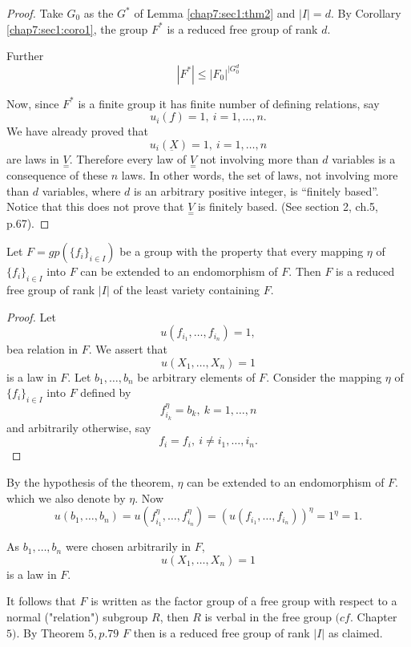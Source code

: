 \begin{proof}
  Take $G_0$ as the $G^*$ of Lemma \ref{chap7:sec1:thm2} and $|I| = d
  $. By Corollary\pageoriginale 
  \ref{chap7:sec1:coro1}, the group $F^*$ is a reduced free group of
  rank $d$.   

  Further
  $$
  |F^*| \leq  |F_0|^{|G_0^{d}}
  $$
  
  Now, since $F^*$  is a finite group it has finite number of defining
  relations, say 
  $$
  u_i(\underbar{f}) = 1, ~ i=1, \ldots,n.
  $$
  We have already proved that 
  $$
  u_i(\underbar{X}) = 1, ~ i=1, \ldots,n
  $$
  are laws in $\underset{=}{V}$. Therefore every law of
  $\underset{=}{V}$ not involving more than $d$ variables is a
  consequence of these $n$ laws. In other words, the set of laws, not
  involving more than $d$ variables, where $d$ is an arbitrary
  positive integer, is ``finitely based''. Notice that  this does not
  prove that $\underset{=}{V}$ is finitely based. (See section 2,
  ch.5, p.67).  
\end{proof}

\begin{theorem}\label{chap7:sec1:thm3} 
  Let $F = gp ( \big\{ f_i \big \}_{i
    \in I})$ be a group with the property that every mapping
  $\eta$ of $ \big \{ f_i \big \}_{i \in I} $ into $F$ can be
  extended to an endomorphism of $F$. Then $F$ is a reduced free group
  of rank $|I|$ of the least variety containing $F$.  
\end{theorem}

\begin{proof}
  Let
  $$
  u(f_{i_{1}}, \ldots, f_{i_{n}}) = 1,
  $$
  be\pageoriginale a relation in $F$. We assert that 
  $$
  u(X_1, \ldots,X_n) = 1
  $$
  is a law in $F$. Let $b_1, \ldots,b_n$ be arbitrary elements of
  $F$. Consider the mapping $\eta$ of $\big\{ f_i \big\}_{i
    \in I}$ into $F$ defined by 
  $$
  f^\eta_{i_{k}} = b_k, ~ k = 1,\ldots,n
  $$
  and arbitrarily otherwise, say
  $$
  f_i = f_i, ~ i \neq i_1, \ldots,i_n. 
  $$
\end{proof}

By the hypothesis  of the theorem, $\eta$ can be extended to an
endomorphism of $F$. which we also denote by  $\eta$. Now 
$$
u(b_1,\ldots,b_n) = u(f^\eta_{i_{1}},\ldots,f^\eta_{i_{n}}) = (u
(f_{i_{1}},\ldots,f_{i_{n}} ))^\eta = 1^\eta = 1. 
$$

As $b_1,\ldots,b_n$ were chosen arbitrarily in $F$,
$$
u(X_1,\ldots,X_n) = 1
$$
is a law in $F$.

It follows that $F$ is written as the factor group of a free group
with respect to a normal ("relation") subgroup $R$, then $R$ is verbal
in the free group $(cf$. Chapter $5)$. By Theorem $5,p.79 $ $F$ then
is a reduced free group of rank $|I|$ as claimed. 

